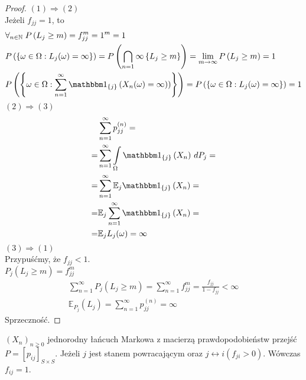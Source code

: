 \begin{proof}
$ (1)\Rightarrow(2) $\\
Jeżeli $ f_{jj}=1 $, to
\begin{align*}
&\forall_{n\in \mathbb N }\;P\left(L_j\ge m\right)=f_{jj}^{m}=1^m=1\\
&P\left(\left\{\omega\in\Omega:L_j(\omega)=\infty \right\}\right)=P\left(\bigcap_{n=1}{\infty }\left\{L_j\ge m\right\}\right)=\lim\limits_{m\to\infty} P\left(L_j\ge m\right)=1\\
&P\left(\left\{\omega\in\Omega:\sum_{n=1}^{\infty }\mathbbm1_{\left\{j\right\}}\left(X_n(\omega)=\infty )\right)\right\}\right)=P\left(\left\{\omega\in\Omega:L_j(\omega)=\infty \right\}\right)=1
\end{align*}
$ (2)\Rightarrow(3) $
\begin{align*}
&\sum_{n=1}^{\infty }p_{jj}^{(n)}
=\\=&
\sum_{n=1}^{\infty }\int\limits_{\Omega}\mathbbm1_{\left\{j\right\}}\left(X_n\right)\,dP_j
=\\=&
\sum_{n=1}^{\infty }\mathbb E _j\mathbbm1_{\left\{j\right\}}\left(X_n\right)
=\\=&
\mathbb E _j\sum_{n=1}^{\infty }\mathbbm1_{\left\{j\right\}}\left(X_n\right)
=\\=&
\mathbb E _jL_j(\omega)=\infty 
\end{align*}
$ (3)\Rightarrow(1) $\\
Przypuśćmy, że $ f_{jj}<1  $.\\
$ P_j\left(L_j\ge m\right)=f_{jj}^m $
\begin{gather*}
\sum_{n=1}^{\infty }P_j\left(L_j\ge m\right)=\sum_{n=1}^{\infty }f_{jj}^m=\frac{f_{jj}}{1-f_{jj}}<\infty \\
\mathbb E _{P_j}\left(L_j\right)=\sum_{n=1}^{\infty }p_{jj}^{(n)}=\infty 
\end{gather*}
Sprzeczność.
\end{proof}
\begin{lem}
$ \left(X_n\right)_{n\ge 0} $ jednorodny łańcuch Markowa z macierzą prawdopodobieństw przejść $ P=\left[p_{ij}\right] _{S\times S}$. Jeżeli $ j $ jest stanem powracającym oraz $ j\longleftrightarrow i (f_{ji}>0)$. Wówczas $ f_{ij}=1 $.
\end{lem}

